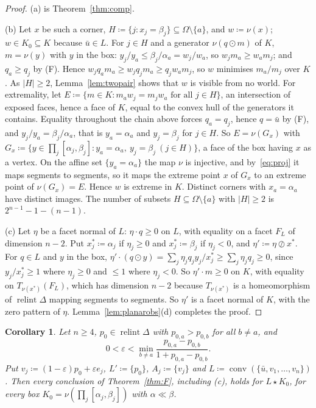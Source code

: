 \documentclass[11pt]{article}
\newcommand{\ub}{\bar u}
\DeclareMathOperator{\conv}{conv}
\DeclareMathOperator{\relint}{relint}
\theoremstyle{plain}
\newtheorem{corollary}[theorem]{Corollary}
\theoremstyle{definition}
\theoremstyle{remark}
\begin{document}
\begin{proof}
(a) is Theorem~\ref{thm:comp}.

(b) Let $x$ be such a corner, $H\coloneqq\{j:x_j=\beta_j\}\subseteq\Omega\setminus\{a\}$,
and $w\coloneqq\nu(x)$; $w\in K_0\subseteq K$ because $\ub\in L$. For $j\in H$ and a
generator $\nu(q\odot m)$ of $K$, $m=\nu(y)$ with $y$ in the box: $y_j/y_a\le\beta_j/\alpha_a
=w_j/w_a$, so $w_jm_a\ge w_am_j$; and $q_a\ge q_j$ by (F). Hence
$w_jq_am_a\ge w_jq_jm_a\ge q_jw_am_j$, so $w$ minimises $m_a/m_j$ over $K$. As $|H|\ge2$,
Lemma~\ref{lem:twopair} shows that $w$ is visible from no world. For extremality, let
$E\coloneqq\{m\in K:m_aw_j=m_jw_a\text{ for all }j\in H\}$, an intersection of exposed
faces, hence a face of $K$, equal to the convex hull of the generators it contains.
Equality throughout the chain above forces $q_a=q_j$, hence $q=\ub$ by (F), and
$y_j/y_a=\beta_j/\alpha_a$, that is $y_a=\alpha_a$ and $y_j=\beta_j$ for $j\in H$. So
$E=\nu(G_x)$ with $G_x\coloneqq\{y\in\prod_j[\alpha_j,\beta_j]:y_a=\alpha_a,\ y_j=\beta_j\
(j\in H)\}$, a face of the box having $x$ as a vertex. On the affine set $\{y_a=\alpha_a\}$
the map $\nu$ is injective, and by~\eqref{eq:proj} it maps segments to segments, so it maps
the extreme point $x$ of $G_x$ to an extreme point of $\nu(G_x)=E$. Hence $w$ is extreme in
$K$. Distinct corners with $x_a=\alpha_a$ have distinct images. The number of subsets
$H\subseteq\Omega\setminus\{a\}$ with $|H|\ge2$ is $2^{n-1}-1-(n-1)$.

(c) Let $\eta$ be a facet normal of $L$: $\eta\cdot q\ge0$ on $L$, with equality on a facet
$F_L$ of dimension $n-2$. Put $x^\ast_j\coloneqq\alpha_j$ if $\eta_j\ge0$ and
$x^\ast_j\coloneqq\beta_j$ if $\eta_j<0$, and $\eta'\coloneqq\eta\oslash x^\ast$. For
$q\in L$ and $y$ in the box, $\eta'\cdot(q\odot y)=\sum_j\eta_jq_jy_j/x^\ast_j\ge\sum_j
\eta_jq_j\ge0$, since $y_j/x^\ast_j\ge1$ where $\eta_j\ge0$ and $\le1$ where $\eta_j<0$.
So $\eta'\cdot m\ge0$ on $K$, with equality on $T_{\nu(x^\ast)}(F_L)$, which has dimension
$n-2$ because $T_{\nu(x^\ast)}$ is a homeomorphism of $\relint\Delta$ mapping segments to
segments. So $\eta'$ is a facet normal of $K$, with the zero pattern of $\eta$.
Lemma~\ref{lem:planarobs}(d) completes the proof.
\end{proof}

\begin{corollary}\label{cor:Ffamily}
Let $n\ge4$, $p_0\in\relint\Delta$ with $p_{0,a}>p_{0,b}$ for all $b\ne a$, and
\[
  0<\varepsilon<\min_{b\ne a}\frac{p_{0,a}-p_{0,b}}{1+p_{0,a}-p_{0,b}}.
\]
Put $v_j\coloneqq(1-\varepsilon)p_0+\varepsilon e_j$, $L'\coloneqq\{p_0\}$, $A_j\coloneqq
\{v_j\}$ and $L\coloneqq\conv(\{\ub,v_1,\dots,v_n\})$. Then every conclusion of
Theorem~\ref{thm:F}, including (c), holds for $L\star K_0$, for every box
$K_0=\nu(\prod_j[\alpha_j,\beta_j])$ with $\alpha\ll\beta$.
\end{corollary}
\end{document}
